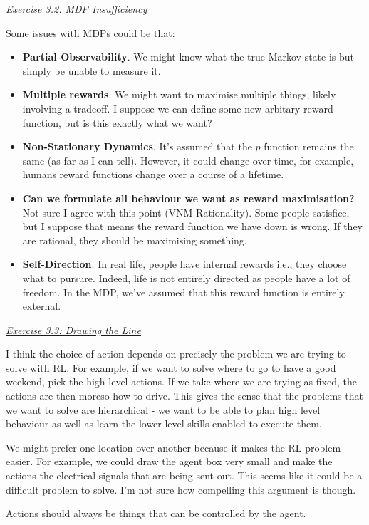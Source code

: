 \documentclass{article}
\newcommand{\myq}[1]{%
	\vspace{1em}
	\noindent\underline{\emph{Exercise #1}}\vspace{0.25em}\linebreak
}
\begin{document}
\myq{3.2: MDP Insufficiency}
Some issues with MDPs could be that:
\begin{itemize}
	\item \textbf{Partial Observability}. We might know what the true Markov state is but simply be unable to measure it. 
	\item \textbf{Multiple rewards}. We might want to maximise multiple things, likely involving a tradeoff. I suppose we can define some new arbitary reward function, but is this exactly what we want?
	\item \textbf{Non-Stationary Dynamics}. It's assumed that the $p$ function remains the same (as far as I can tell). However, it could change over time, for example, humans reward functions change over a course of a lifetime.
	\item \textbf{Can we formulate all behaviour we want as reward maximisation?} Not sure I agree with this point (VNM Rationality). Some people satisfice, but I suppose that means the reward function we have down is wrong. If they are rational, they should be maximising something. 
	\item \textbf{Self-Direction}. In real life, people have internal rewards i.e., they choose what to pursure. Indeed, life is not entirely directed as people have a lot of freedom. In the MDP, we've assumed that this reward function is entirely external. 
\end{itemize}

\myq{3.3: Drawing the Line}
I think the choice of action depends on precisely the problem we are trying to solve with RL. For example, if we want to solve where to go to have a good weekend, pick the high level actions. If we take where we are trying as fixed, the actions are then moreso how to drive. This gives the sense that the problems that we want to solve are hierarchical - we want to be able to plan high level behaviour as well as learn the lower level skills enabled to execute them.

We might prefer one location over another because it makes the RL problem easier. For example, we could draw the agent box very small and make the actions the electrical signals that are being sent out. This seems like it could be a difficult problem to solve. I'm not sure how compelling this argument is though. 

Actions should always be things that can be controlled by the agent. 
\end{document}
